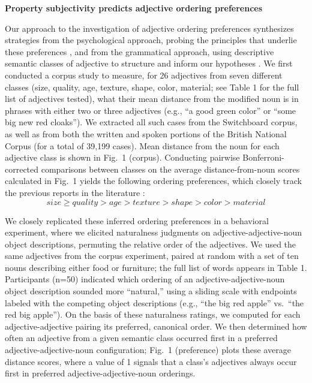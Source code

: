 \documentclass[12pt]{article}
\begin{document}
\begin{center}\textbf{Property subjectivity predicts adjective ordering preferences}
\end{center}
	
	\vspace{-15pt}
	
Our approach to the investigation of adjective ordering preferences synthesizes strategies from the psychological approach, probing the principles that underlie these preferences \cite{sweet1898,ziff1960,martin1969determinants,martin1969competence,martin1970,kemmereretal2009}, and from the grammatical approach, using descriptive semantic classes of adjective to structure and inform our hypotheses \cite{dixon1982,sproatshih1991,cinque1994,scott2002}. We first conducted a corpus study to measure, for 26 adjectives from seven different classes (size, quality, age, texture, shape, color, material; see Table 1 for the full list of adjectives tested), what their mean distance from the modified noun is in phrases with either two or three adjectives (e.g., ``a good green color'' or ``some big new red cloaks''). We extracted all such cases from the Switchboard corpus, as well as from both the written and spoken portions of the British National Corpus (for a total of 39,199 cases). Mean distance from the noun for each adjective class is shown in Fig.~1 (corpus).
Conducting pairwise Bonferroni-corrected comparisons between classes on the average distance-from-noun scores calculated in Fig.~1 yields the following ordering preferences, which closely track the previous reports in the literature \cite{sproatshih1991,dixon1982}:
\vspace{-13pt}
$$ size \geq quality > age > texture > shape > color > material \label{inferred-order-preferences}$$

\vspace{-13pt}

We closely replicated these inferred ordering preferences in a behavioral experiment, where we elicited naturalness judgments on adjective-adjective-noun object descriptions, permuting the relative order of the adjectives. We used the same adjectives from the corpus experiment, paired at random with a set of ten nouns describing either food or furniture; the full list of words appears in Table 1.
Participants (n=50) indicated which ordering of an adjective-adjective-noun object description sounded more ``natural,'' using a sliding scale with endpoints labeled with the competing object descriptions (e.g., ``the big red apple'' vs.\ ``the red big apple''). On the basis of these naturalness ratings, we computed for each adjective-adjective pairing its preferred, canonical order. We then determined how often an adjective from a given semantic class occurred first in a preferred adjective-adjective-noun configuration; Fig.~1 (preference) plots these average distance scores, where a value of 1 signals that a class's adjectives always occur first in preferred adjective-adjective-noun orderings. 
\end{document}

